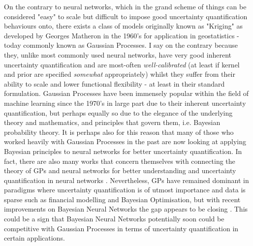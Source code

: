 \noindent On the contrary to neural networks, which in the grand scheme of things can be considered "easy" to scale but difficult to impose good uncertainty quantification behaviours onto, there exists a class of models originally known as "Kriging" as developed by Georges Matheron in the 1960's for application in geostatistics \citep{1963_matheron} - today commonly known as Gaussian Processes. I say on the contrary because they, unlike most commonly used neural networks, have very good inherent uncertainty quantification and are most-often \textit{well-calibrated} (at least if kernel and prior are specified \textit{somewhat} appropriately) whilst they suffer from their ability to scale and lower functional flexibility - at least in their standard formulation. Gaussian Processes have been immensely popular within the field of machine learning since the 1970's in large part due to their inherent uncertainty quantification, but perhaps equally so due to the elegance of the underlying theory and mathematics, and principles that govern them, i.e. Bayesian probability theory. It is perhaps also for this reason that many of those who worked heavily with Gaussian Processes in the past are now looking at applying Bayesian principles to neural networks for better uncertainty quantification. In fact, there are also many works that concern themselves with connecting the theory of GPs and neural networks for better understanding and uncertainty quantification in neural networks \citep{Lee2017DeepNN, NEURIPS2018_5a4be1fa, ApproximateInferenceasGPs}. Nevertheless, GPs have remained dominant in paradigms where uncertainty quantification is of utmost importance and data is sparse such as financial modelling \citep{Gonzalvez2019FinancialAO} and Bayesian Optimisation, but with recent improvements on Bayesian Neural Networks the gap appears to be closing \citep{li2024a}. This could be a sign that Bayesian Neural Networks potentially soon could be competitive with Gaussian Processes in terms of uncertainty quantification in certain applications.\\

